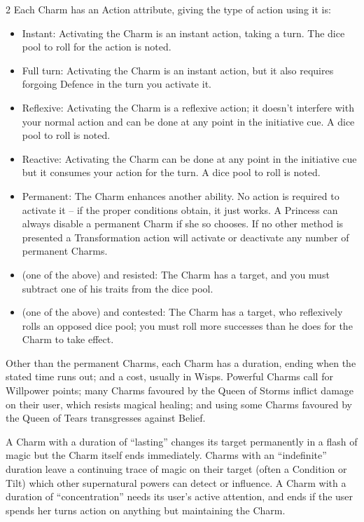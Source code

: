 \begin{multicols}{2}
Each Charm has an Action attribute, giving the type of action using it is:

\begin{itemize}
\item Instant: Activating the Charm is an instant action, taking a turn. The dice pool to roll for the action is noted.
\item Full turn: Activating the Charm is an instant action, but it also requires forgoing Defence in the turn you activate it.
\item Reflexive: Activating the Charm is a reflexive action; it doesn't interfere with your normal action and can be done at any point in the initiative cue. A dice pool to roll is noted.
\item Reactive: Activating the Charm can be done at any point in the initiative cue but it consumes your action for the turn. A dice pool to roll is noted.
\item Permanent: The Charm enhances another ability. No action is required to activate it -- if the proper conditions obtain, it just works. A Princess can always disable a permanent Charm if she so chooses. If no other method is presented a Transformation action will activate or deactivate any number of permanent Charms. 
\item (one of the above) and resisted: The Charm has a target, and you must subtract one of his traits from the dice pool.
\item (one of the above) and contested: The Charm has a target, who reflexively rolls an opposed dice pool; you must roll more successes than he does for the Charm to take effect.
\end{itemize}
    
Other than the permanent Charms, each Charm has a duration, ending when the stated time runs out; and a cost, usually in Wisps. Powerful Charms call for Willpower points; many Charms favoured by the Queen of Storms inflict damage on their user, which resists magical healing; and using some Charms favoured by the Queen of Tears transgresses against Belief. 

A Charm with a duration of \textquotedblleft lasting” changes its target permanently in a flash of magic but the Charm itself ends immediately. Charms with an \textquotedblleft indefinite” duration leave a continuing trace of magic on their target (often a Condition or Tilt) which other supernatural powers can detect or influence. A Charm with a duration of \textquotedblleft concentration” needs its user’s active attention, and ends if the user spends her turns action on anything but maintaining the Charm.


\end{multicols}
